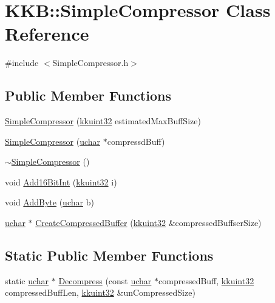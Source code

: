 \hypertarget{class_k_k_b_1_1_simple_compressor}{}\section{K\+KB\+:\+:Simple\+Compressor Class Reference}
\label{class_k_k_b_1_1_simple_compressor}


{\ttfamily \#include $<$Simple\+Compressor.\+h$>$}

\subsection*{Public Member Functions}
\begin{DoxyCompactItemize}
\item 
\hyperlink{class_k_k_b_1_1_simple_compressor_a84bb2ef357335e1ecdca2fe339648a58}{Simple\+Compressor} (\hyperlink{namespace_k_k_b_af8d832f05c54994a1cce25bd5743e19a}{kkuint32} estimated\+Max\+Buff\+Size)
\item 
\hyperlink{class_k_k_b_1_1_simple_compressor_ac9d38e3c3ecf02a9f6cf7b1d3e274c8f}{Simple\+Compressor} (\hyperlink{namespace_k_k_b_ace9969169bf514f9ee6185186949cdf7}{uchar} $\ast$compressd\+Buff)
\item 
\hyperlink{class_k_k_b_1_1_simple_compressor_a287ac90dcdd3012111d3082dd719c23e}{$\sim$\+Simple\+Compressor} ()
\item 
void \hyperlink{class_k_k_b_1_1_simple_compressor_a11537071e5346497b0ec6b579c706de4}{Add16\+Bit\+Int} (\hyperlink{namespace_k_k_b_af8d832f05c54994a1cce25bd5743e19a}{kkuint32} i)
\item 
void \hyperlink{class_k_k_b_1_1_simple_compressor_a39979cc9a8389bb30eb584da8544c378}{Add\+Byte} (\hyperlink{namespace_k_k_b_ace9969169bf514f9ee6185186949cdf7}{uchar} b)
\item 
\hyperlink{namespace_k_k_b_ace9969169bf514f9ee6185186949cdf7}{uchar} $\ast$ \hyperlink{class_k_k_b_1_1_simple_compressor_ac76fdfcca5474465ecedc6df55a60086}{Create\+Compressed\+Buffer} (\hyperlink{namespace_k_k_b_af8d832f05c54994a1cce25bd5743e19a}{kkuint32} \&compressed\+Buffser\+Size)
\end{DoxyCompactItemize}
\subsection*{Static Public Member Functions}
\begin{DoxyCompactItemize}
\item 
static \hyperlink{namespace_k_k_b_ace9969169bf514f9ee6185186949cdf7}{uchar} $\ast$ \hyperlink{class_k_k_b_1_1_simple_compressor_ac36d8a5ef877583713f50bd241d3e8c0}{Decompress} (const \hyperlink{namespace_k_k_b_ace9969169bf514f9ee6185186949cdf7}{uchar} $\ast$compressed\+Buff, \hyperlink{namespace_k_k_b_af8d832f05c54994a1cce25bd5743e19a}{kkuint32} compressed\+Buff\+Len, \hyperlink{namespace_k_k_b_af8d832f05c54994a1cce25bd5743e19a}{kkuint32} \&un\+Compressed\+Size)
\end{DoxyCompactItemize}


